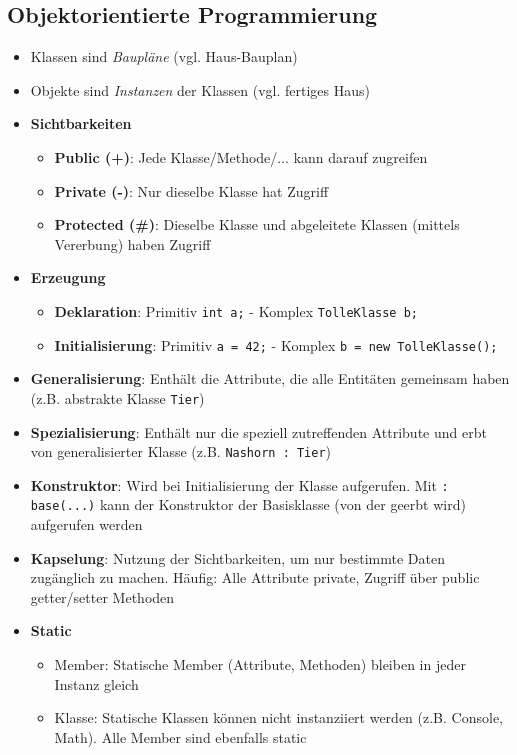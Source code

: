 \documentclass[a4paper, 11pt]{article}
\begin{document}
\subsection{Objektorientierte Programmierung}
\begin{itemize}
	\item Klassen sind \textit{Baupläne} (vgl. Haus-Bauplan)
	\item Objekte sind \textit{Instanzen} der Klassen (vgl. fertiges Haus)
	\item \textbf{Sichtbarkeiten}
	      \begin{itemize}
		      \item \textbf{Public (+)}: Jede Klasse/Methode/... kann darauf zugreifen
		      \item \textbf{Private (-)}: Nur dieselbe Klasse hat Zugriff
		      \item \textbf{Protected (\#)}: Dieselbe Klasse und abgeleitete Klassen (mittels Vererbung) haben Zugriff
	      \end{itemize}
	\item \textbf{Erzeugung}
	      \begin{itemize}
		      \item \textbf{Deklaration}: Primitiv \texttt{int a;} - Komplex \texttt{TolleKlasse b;}
		      \item \textbf{Initialisierung}: Primitiv \texttt{a = 42;} - Komplex \texttt{b = new TolleKlasse();}
	      \end{itemize}
	\item \textbf{Generalisierung}: Enthält die Attribute, die alle Entitäten gemeinsam haben (z.B. abstrakte Klasse \texttt{Tier})
	\item \textbf{Spezialisierung}: Enthält nur die speziell zutreffenden Attribute und erbt von generalisierter Klasse (z.B. \texttt{Nashorn : Tier})
	\item \textbf{Konstruktor}: Wird bei Initialisierung der Klasse aufgerufen. Mit \texttt{: base(...)} kann der Konstruktor der Basisklasse (von der geerbt wird) aufgerufen werden
	\item \textbf{Kapselung}: Nutzung der Sichtbarkeiten, um nur bestimmte Daten zugänglich zu machen. Häufig: Alle Attribute private, Zugriff über public getter/setter Methoden
	\item \textbf{Static}
	      \begin{itemize}
		      \item Member: Statische Member (Attribute, Methoden) bleiben in jeder Instanz gleich
		      \item Klasse: Statische Klassen können nicht instanziiert werden (z.B. Console, Math). Alle Member sind ebenfalls static

\end{itemize}
\end{itemize}
\end{document}
